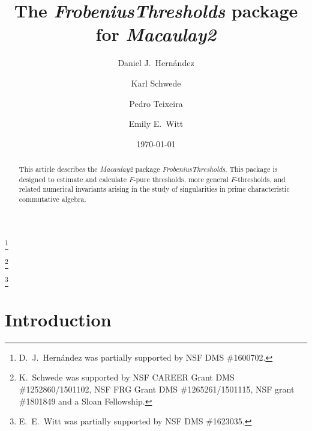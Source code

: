 \documentclass{amsart}
\begin{document}
\title[]{The \emph{FrobeniusThresholds} package for \emph{Macaulay2}}

\author[]{Daniel J.\ Hern\'andez}
\address{Department of Mathematics, University of Kansas, Lawrence, KS~66045, USA}
\thanks{D.~J.~Hern\'andez was partially supported by NSF DMS \#1600702.}



\author[]{Karl Schwede}
\address{Department of Mathematics, University of Utah, Salt Lake City, UT~84112, USA}
\thanks{K.~Schwede was supported by NSF CAREER Grant DMS \#1252860/1501102, NSF FRG Grant DMS \#1265261/1501115, NSF grant \#1801849 and a Sloan Fellowship.}

\author[]{Pedro Teixeira}
\address{Department of Mathematics, Knox College, Galesburg, IL~61401, USA}

\author[]{Emily E.\ Witt}
\address{Department of Mathematics, University of Kansas, Lawrence, KS~66045, USA}
\thanks{E.~E.~Witt was partially supported by NSF DMS \#1623035.}
\date{\today}

\begin{abstract}
   This article describes the \emph{Macaulay2} package \emph{FrobeniusThresholds}.
   This package is designed to estimate and calculate $F$-pure thresholds, more general $F$-thresholds, and related numerical invariants arising in the study of singularities in prime characteristic commutative algebra.
\end{abstract}



\maketitle


\section{Introduction}
\end{document}
